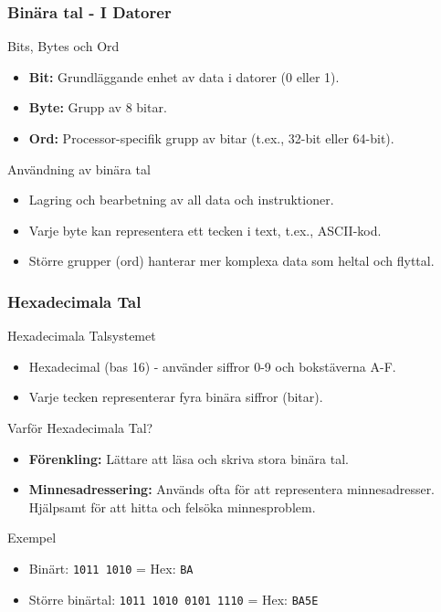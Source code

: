 \begin{frame}
    \frametitle{Binära tal - I Datorer}
    \begin{block}{Bits, Bytes och Ord}
        \begin{itemize}
            \item \textbf{Bit:} Grundläggande enhet av data i datorer (0 eller 1).
            \item \textbf{Byte:} Grupp av 8 bitar.
            \item \textbf{Ord:} Processor-specifik grupp av bitar (t.ex., 32-bit eller 64-bit).
        \end{itemize}
    \end{block}
    \begin{block}{Användning av binära tal}
        \begin{itemize}
            \item Lagring och bearbetning av all data och instruktioner.
            \item Varje byte kan representera ett tecken i text, t.ex., ASCII-kod.
            \item Större grupper (ord) hanterar mer komplexa data som heltal och flyttal.
        \end{itemize}
    \end{block}
\end{frame}

\begin{frame}
    \frametitle{Hexadecimala Tal}
    \begin{block}{Hexadecimala Talsystemet}
        \begin{itemize}
            \item Hexadecimal (bas 16) - använder siffror 0-9 och bokstäverna A-F.
            \item Varje tecken representerar fyra binära siffror (bitar).
        \end{itemize}
    \end{block}
    \begin{block}{Varför Hexadecimala Tal?}
        \begin{itemize}
            \item \textbf{Förenkling:} Lättare att läsa och skriva stora binära tal.
            \item \textbf{Minnesadressering:} Används ofta för att representera minnesadresser. Hjälpsamt för att hitta och felsöka minnesproblem.
        \end{itemize}
    \end{block}
    \begin{block}{Exempel}
        \begin{itemize}
            \item Binärt: \texttt{1011 1010} = Hex: \texttt{BA}
            \item Större binärtal: \texttt{1011 1010 0101 1110} = Hex: \texttt{BA5E}
        \end{itemize}
    \end{block}
\end{frame}




